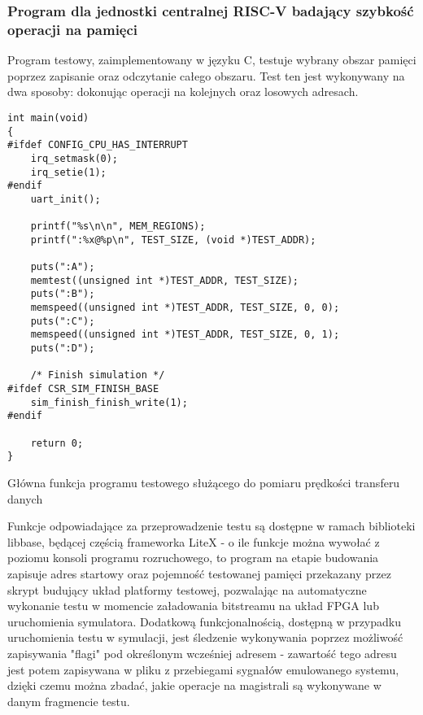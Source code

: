 \subsubsection{Program dla jednostki centralnej RISC-V badający szybkość operacji na pamięci}

Program testowy, zaimplementowany w języku C, testuje wybrany obszar pamięci poprzez zapisanie oraz odczytanie całego obszaru. Test ten jest wykonywany na dwa sposoby: dokonując operacji na kolejnych oraz losowych adresach.

\begin{listing}[H]
\begin{verbatim}
int main(void)
{
#ifdef CONFIG_CPU_HAS_INTERRUPT
    irq_setmask(0);
    irq_setie(1);
#endif
    uart_init();

    printf("%s\n\n", MEM_REGIONS);
    printf(":%x@%p\n", TEST_SIZE, (void *)TEST_ADDR);

    puts(":A");
    memtest((unsigned int *)TEST_ADDR, TEST_SIZE);
    puts(":B");
    memspeed((unsigned int *)TEST_ADDR, TEST_SIZE, 0, 0);
    puts(":C");
    memspeed((unsigned int *)TEST_ADDR, TEST_SIZE, 0, 1);
    puts(":D");

    /* Finish simulation */
#ifdef CSR_SIM_FINISH_BASE
    sim_finish_finish_write(1);
#endif

    return 0;
}
\end{verbatim}
\caption{\label{lst:benchmark-main.c}Główna funkcja programu testowego służącego do pomiaru prędkości transferu danych}
\end{listing}

Funkcje odpowiadające za przeprowadzenie testu są dostępne w ramach biblioteki libbase, będącej częścią frameworka LiteX - o ile funkcje można wywołać z poziomu konsoli programu rozruchowego, to program na etapie budowania zapisuje adres startowy oraz pojemność testowanej pamięci przekazany przez skrypt budujący układ platformy testowej, pozwalając na automatyczne wykonanie testu w momencie załadowania bitstreamu na układ FPGA lub uruchomienia symulatora.
Dodatkową funkcjonalnością, dostępną w przypadku uruchomienia testu w symulacji, jest śledzenie wykonywania poprzez możliwość zapisywania "flagi" pod określonym wcześniej adresem - zawartość tego adresu jest potem zapisywana w pliku z przebiegami sygnałów emulowanego systemu, dzięki czemu można zbadać, jakie operacje na magistrali są wykonywane w danym fragmencie testu.


